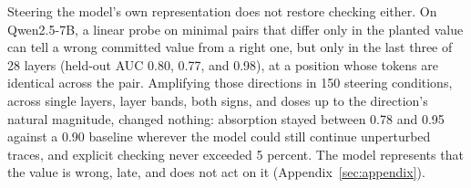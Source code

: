 Steering the model's own representation does not restore checking either. On Qwen2.5-7B, a linear probe on minimal pairs that differ only in the planted value can tell a wrong committed value from a right one, but only in the last three of 28 layers (held-out AUC 0.80, 0.77, and 0.98), at a position whose tokens are identical across the pair. Amplifying those directions in 150 steering conditions, across single layers, layer bands, both signs, and doses up to the direction's natural magnitude, changed nothing: absorption stayed between 0.78 and 0.95 against a 0.90 baseline wherever the model could still continue unperturbed traces, and explicit checking never exceeded 5 percent. The model represents that the value is wrong, late, and does not act on it (Appendix~\ref{sec:appendix}).
